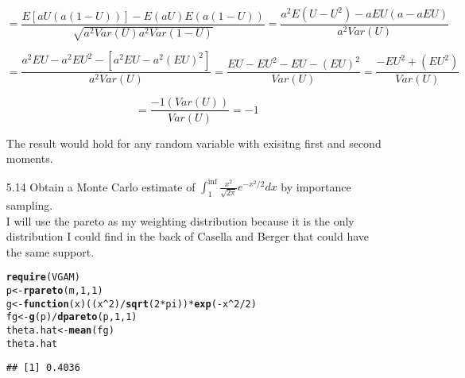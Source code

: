 \documentclass{article}\usepackage[]{graphicx}\usepackage[]{color}
\makeatletter
\newcommand{\hlkwd}[1]{\textcolor[rgb]{0.737,0.353,0.396}{\textbf{#1}}}%
\newenvironment{kframe}{%
 \def\at@end@of@kframe{}%
 \ifinner\ifhmode%
  \def\at@end@of@kframe{\end{minipage}}%
  \begin{minipage}{\columnwidth}%
 \fi\fi%
 \def\FrameCommand##1{\hskip\@totalleftmargin \hskip-\fboxsep
 \colorbox{shadecolor}{##1}\hskip-\fboxsep
     \hskip-\linewidth \hskip-\@totalleftmargin \hskip\columnwidth}%
 \MakeFramed {\advance\hsize-\width
   \@totalleftmargin\z@ \linewidth\hsize
   \@setminipage}}%
 {\par\unskip\endMakeFramed%
 \at@end@of@kframe}
\newenvironment{knitrout}{}{} %
\makeatother
\begin{document}
\begin{itemize}
$$ = \frac{E\left[aU(a(1-U))\right]-E(aU)E(a(1-U))}{\sqrt{a^2Var(U)a^2Var(1-U)}} = \frac{a^2E(U-U^2)-aEU(a-aEU)}{a^2Var(U)}$$
 
$$ = \frac{a^2EU-a^2EU^2-\left[ a^2EU - a^2(EU)^2\right]}{a^2Var(U)} = \frac{EU-EU^2-EU-(EU)^2}{Var(U)} = \frac{-EU^2+(EU^2)}{Var(U)}$$
 
$$ = \frac{-1(Var(U))}{Var(U)} = -1$$
 
The result would hold for any random variable with exisitng first and second moments.\\

\item[5.14] Obtain a Monte Carlo estimate of $\int_1^{\inf}\frac{x^2}{\sqrt{2\pi}}e^{-x^2/2}dx$ by importance sampling.\\
I will use the pareto as my weighting distribution because it is the only distribution I could find in the back of Casella and Berger that could have the same support.\\
\begin{knitrout}
\color{fgcolor}\begin{kframe}
\begin{alltt}
\hlkwd{require}(VGAM)
p <- \hlkwd{rpareto}(m, 1, 1)
g <- \hlkwd{function}(x) ((x^2)/\hlkwd{sqrt}(2 * pi)) * \hlkwd{exp}(-x^2/2)
fg <- \hlkwd{g}(p)/\hlkwd{dpareto}(p, 1, 1)
theta.hat <- \hlkwd{mean}(fg)
theta.hat
\end{alltt}
\begin{verbatim}
## [1] 0.4036
\end{verbatim}
\end{kframe}
\end{knitrout}

\end{itemize}
\end{document}
